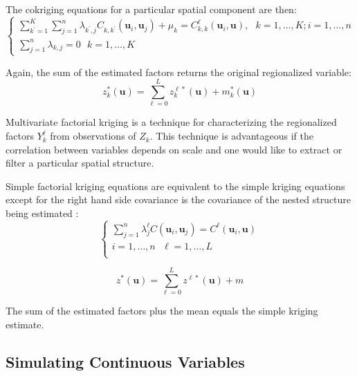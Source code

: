 The cokriging equations for a particular spatial component are then:
\begin{equation*}
    \begin{cases}
        \sum_{k^{\prime}=1}^{K} \sum_{j=1}^{n} \lambda_{k^{\prime},j} C_{k,k^{\prime}}(\mathbf{u}_{i}, \mathbf{u}_{j}) + \mu_{k} = C_{k,k}^{\ell}(\mathbf{u}_{i},\mathbf{u}), \ \ \ k=1,\dots,K; i=1,\dots,n \\
        \sum_{j=1}^{n} \lambda_{k,j} = 0  \ \ \ k=1,\dots,K
    \end{cases}
\end{equation*}

Again, the sum of the estimated factors returns the original regionalized variable:
\begin{equation*}
    z^{*}_{k}(\mathbf{u}) = \sum_{\ell=0}^{L} z^{\ell*}_{k}(\mathbf{u}) + m^{*}_{k}(\mathbf{u})
\end{equation*}

Multivariate factorial kriging is a technique for characterizing the regionalized factors $Y_{k}^{\ell}$ from observations of $Z_{k}$. This technique is advantageous if the correlation between variables depends on scale and one would like to extract or filter a particular spatial structure.

Simple factorial kriging equations are equivalent to the simple kriging equations except for the right hand side covariance is the covariance of the nested structure being estimated \citep{hong2007improved}:
\begin{equation*}
    \begin{cases}
        \sum_{j=1}^{n} \lambda_{j}^{\ell} C(\mathbf{u}_{i}, \mathbf{u}_{j}) = C^{\ell}(\mathbf{u}_{i}, \mathbf{u}) \\
        i=1,\dots,n \ \ \ \ell=1,\dots,L                                                                           \\
    \end{cases}
\end{equation*}

\begin{equation*}
    z^{*}(\mathbf{u}) = \sum_{\ell=0}^{L} z^{\ell*}(\mathbf{u}) + m
\end{equation*}

The sum of the estimated factors plus the mean equals the simple kriging estimate.

\FloatBarrier
\subsection{Simulating Continuous Variables}
\label{subsec:03simulate}

